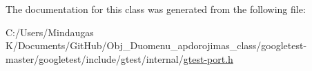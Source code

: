 The documentation for this class was generated from the following file\+:\begin{DoxyCompactItemize}
\item 
C\+:/\+Users/\+Mindaugas K/\+Documents/\+Git\+Hub/\+Obj\+\_\+\+Duomenu\+\_\+apdorojimas\+\_\+class/googletest-\/master/googletest/include/gtest/internal/\mbox{\hyperlink{googletest-master_2googletest_2include_2gtest_2internal_2gtest-port_8h}{gtest-\/port.\+h}}\end{DoxyCompactItemize}

